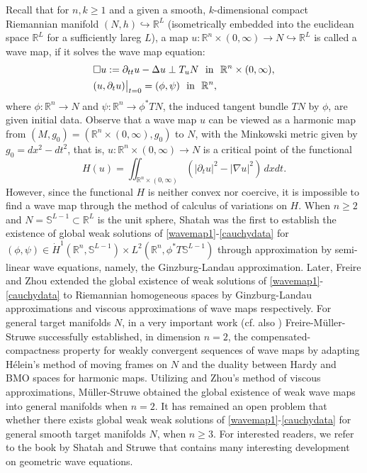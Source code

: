 \documentclass[12pt,twoside,reqno]{amsart}
\theoremstyle{definition}              %
\theoremstyle{remark}                  %
\newcommand{\R}{\mathbb{R}}                 %
\renewcommand{\1}{\mathbbm{1}}                                      %
\numberwithin{equation}{section}
\numberwithin{definition}{section}
\numberwithin{theorem}{section}
\numberwithin{remark}{section}
\begin{document}
Recall that for $n, k\ge 1$ and a given a smooth, $k$-dimensional compact Riemannian manifold $(N,h)\hookrightarrow\mathbb{R}^L$
(isometrically embedded into
the euclidean space $\R^L$ for a sufficiently lareg $L$), 
a map $u:\R^n\times (0,\infty)\to N\hookrightarrow \R^L$ is called a wave map, if it solves the wave map equation:
\begin{align}
&\Box u:=\partial_{tt}u-\Delta u\perp T_u N \ 
\ {\rm{in}}\ \ \R^n\times (0,\infty),\label{wavemap1}\\
&(u, \partial_t u)\big|_{t=0}=(\phi,\psi)\
\ {\rm{in}}\ \ \R^n, \label{cauchydata}
\end{align}
where $\phi:\R^n\to N$ and $\psi: \R^n\to \phi^*TN$, the induced tangent bundle $TN$ by $\phi$, are given initial data. Observe that a wave map $u$ can be viewed as a harmonic map from $(M, g_0)=(\R^n\times (0,\infty), g_0)$ to $N$, 
with the Minkowski metric given by $g_0=dx^2-dt^2$, that is, 
$u:\R^n\times (0,\infty)\to N$ is a critical point of the  functional
\[
H(u)=\iint_{\R^n\times (0,\infty)}
(|\partial_t u|^2-|\nabla u|^2)\,dxdt.
\]
However, since the functional $H$ is neither convex nor coercive, it is impossible to find a wave map through the method of calculus of variations on $H$. When $n\ge 2$ and $N=\mathbb{S}^{L-1}\subset\R^L$ is the unit sphere, Shatah \cite{Shatah1988} was the first to establish the existence of global weak solutions of \eqref{wavemap1}-\eqref{cauchydata} for $(\phi,\psi)\in \dot{H}^1(\R^n,\mathbb S^{L-1})\times L^2(\R^n, \phi^*T\mathbb{S}^{L-1})$ through
approximation by semi-linear wave equations, namely, the Ginzburg-Landau approximation. Later,  Freire \cite{Freire1996} and Zhou \cite{Zhou1999}
extended the global existence of weak solutions of \eqref{wavemap1}-\eqref{cauchydata} to Riemannian homogeneous spaces by Ginzburg-Landau approximations and viscous approximations of wave maps respectively. For general target manifolds $N$,  in a very important work \cite{FreireMullerStruwe1997} (cf. also \cite{FreireMullerStruwe1998}) Freire-M\"uller-Struwe successfully
established, in dimension $n=2$, the compensated-compactness property for weakly convergent sequences of wave maps by adapting
H\'elein's method of moving frames on $N$ and the duality
between Hardy and BMO spaces for harmonic maps. Utilizing
\cite{FreireMullerStruwe1997} and Zhou's method of viscous approximations, M\"uller-Struwe \cite{MullerStruwe1996} obtained the global existence
of weak wave maps into general manifolds when $n=2$.
It has remained an open problem that  whether there exists
global weak weak solutions of \eqref{wavemap1}-\eqref{cauchydata}
for general smooth target manifolds $N$, when $n\ge 3$. For interested readers, we refer to the book \cite{Shatah-Struwe} by Shatah and Struwe that contains many interesting development on geometric wave equations. 
\end{document}
